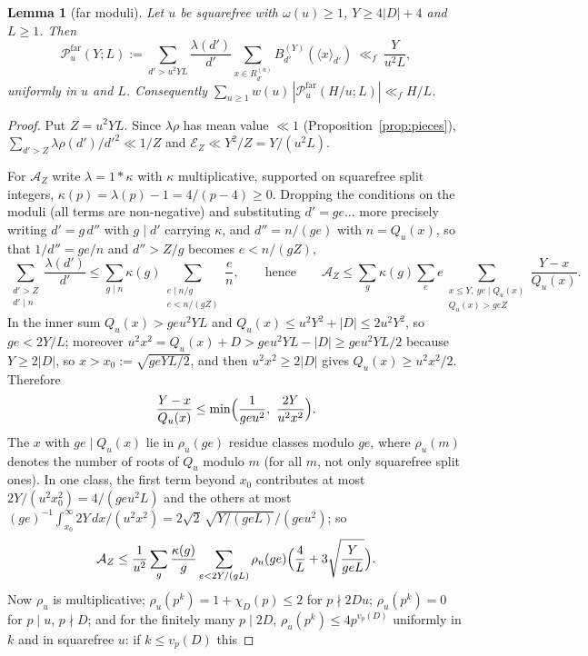 \documentclass[11pt,a4paper]{article}
\newtheorem{lemma}[theorem]{Lemma}
\theoremstyle{remark}\newtheorem{remark}[theorem]{Remark}
\newcommand{\rep}[2]{\langle #1\rangle_{#2}}
\begin{document}
\begin{lemma}[far moduli]\label{lem:far}
Let $u$ be squarefree with $\omega(u)\ge1$, $Y\ge4|D|+4$ and $L\ge1$. Then
\[
\mathcal P^{\mathrm{far}}_u(Y;L):=\sum_{d'>u^2YL}\frac{\lambda(d')}{d'}\sum_{x\in R^{(u)}_{d'}}B^{(Y)}_{d'}(\rep x{d'})\ \ll_f\ \frac Y{u^2L},
\]
uniformly in $u$ and $L$. Consequently $\sum_{u\ge1}w(u)\,|\mathcal P^{\mathrm{far}}_u(H/u;L)|\ll_fH/L$.
\end{lemma}
\begin{proof}
Put $Z=u^2YL$. Since $\lambda\rho$ has mean value $\ll1$ (Proposition~\ref{prop:pieces}), $\sum_{d'>Z}\lambda\rho(d')/d'^2\ll1/Z$
and $\mathcal E_Z\ll Y^2/Z=Y/(u^2L)$.

For $\mathcal A_Z$ write $\lambda=1*\kappa$ with $\kappa$ multiplicative, supported on squarefree split integers,
$\kappa(p)=\lambda(p)-1=4/(p-4)\ge0$. Dropping the conditions on the moduli (all terms are non-negative) and
substituting $d'=ge$... more precisely writing $d'=g\,d''$ with $g\mid d'$ carrying $\kappa$, and $d''=n/(ge)$ with
$n=Q_u(x)$, so that $1/d''=ge/n$ and $d''>Z/g$ becomes $e<n/(gZ)$,
\[
\sum_{\substack{d'>Z\\ d'\mid n}}\frac{\lambda(d')}{d'}\le\sum_{g\mid n}\kappa(g)\sum_{\substack{e\mid n/g\\ e<n/(gZ)}}\frac{e}{n},
\qquad\text{hence}\qquad
\mathcal A_Z\le\sum_g\kappa(g)\sum_e e\sum_{\substack{x\le Y,\ ge\mid Q_u(x)\\ Q_u(x)>geZ}}\frac{Y-x}{Q_u(x)}.
\]
In the inner sum $Q_u(x)>geu^2YL$ and $Q_u(x)\le u^2Y^2+|D|\le2u^2Y^2$, so $ge<2Y/L$; moreover
$u^2x^2=Q_u(x)+D>geu^2YL-|D|\ge geu^2YL/2$ because $Y\ge2|D|$, so $x>x_0:=\sqrt{geYL/2}$, and then
$u^2x^2\ge2|D|$ gives $Q_u(x)\ge u^2x^2/2$. Therefore
\[
\frac{Y-x}{Q_u(x)}\le\min\Bigl(\frac1{geu^2},\ \frac{2Y}{u^2x^2}\Bigr).
\]
The $x$ with $ge\mid Q_u(x)$ lie in $\rho_u(ge)$ residue classes modulo $ge$, where $\rho_u(m)$ denotes the number of
roots of $Q_u$ modulo $m$ (for all $m$, not only squarefree split ones). In one class, the first term beyond $x_0$
contributes at most $2Y/(u^2x_0^2)=4/(geu^2L)$ and the others at most $(ge)^{-1}\int_{x_0}^\infty2Y\,dx/(u^2x^2)=2\sqrt{2}\,\sqrt{Y/(geL)}/(geu^2)$;
so
\[
\mathcal A_Z\le\frac1{u^2}\sum_g\frac{\kappa(g)}g\sum_{e<2Y/(gL)}\rho_u(ge)\Bigl(\frac4L+3\sqrt{\frac Y{geL}}\Bigr).
\]
Now $\rho_u$ is multiplicative; $\rho_u(p^k)=1+\chi_D(p)\le2$ for $p\nmid2Du$; $\rho_u(p^k)=0$ for $p\mid u$, $p\nmid D$; and
for the finitely many $p\mid2D$, $\rho_u(p^k)\le4p^{v_p(D)}$ uniformly in $k$ and in squarefree $u$: if $k\le v_p(D)$ this

\end{proof}
\end{document}
